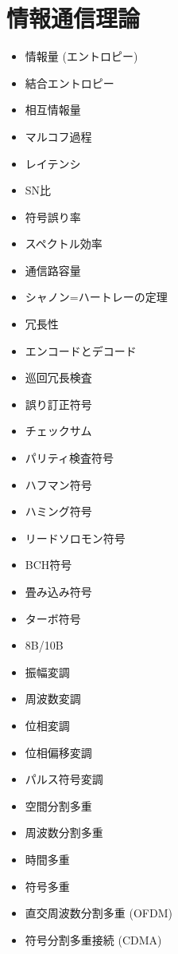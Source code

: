 \documentclass[a4j, titlepage, 11pt]{jsarticle}
\begin{document}
\section{情報通信理論}
\begin{multicols}{2}
\begin{itemize}
	\item 情報量 (エントロピー)
	\item 結合エントロピー
	\item 相互情報量
	\item マルコフ過程
	\item レイテンシ
	\item SN比
	\item 符号誤り率
	\item スペクトル効率
	\item 通信路容量
	\item シャノン=ハートレーの定理
	\item 冗長性
	\item エンコードとデコード
	\item 巡回冗長検査
	\item 誤り訂正符号
	\item チェックサム
	\item パリティ検査符号
	\item ハフマン符号
	\item ハミング符号
	\item リードソロモン符号
	\item BCH符号
	\item 畳み込み符号
	\item ターボ符号
	\item 8B/10B
	\item 振幅変調
	\item 周波数変調
	\item 位相変調
	\item 位相偏移変調
	\item パルス符号変調
	\item 空間分割多重
	\item 周波数分割多重
	\item 時間多重
	\item 符号多重
	\item 直交周波数分割多重 (OFDM)
	\item 符号分割多重接続 (CDMA)
\end{itemize}
\end{multicols}
\end{document}
